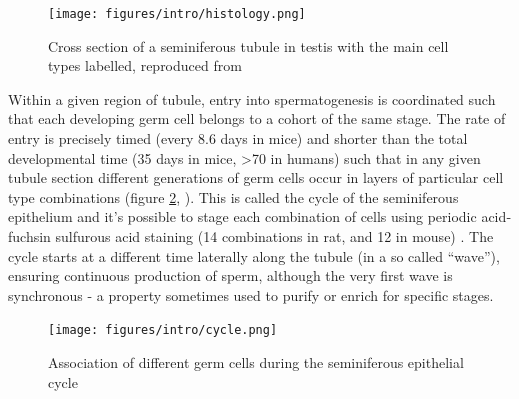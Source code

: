 \begin{figure}[H]
	\centering
	\texttt{[image: figures/intro/histology.png]}
	\caption[Testis Anatomy]{Cross section of a seminiferous tubule in testis with the main cell types labelled, reproduced from~\cite{Junqueira2005Basic}}
	\label{fig:histology}
\end{figure}

Within a given region of tubule, entry into spermatogenesis is coordinated such that each developing germ cell belongs to a cohort of the same stage. The rate of entry is precisely timed (every 8.6 days in mice) and shorter than the total developmental time (35 days in mice, >70 in humans) such that in any given tubule section different generations of germ cells occur in layers of particular cell type combinations (figure \ref{fig:cycle}, \cite{Oakberg1956Duration,Clermont1969Duration, Heller1969Human}). This is called the cycle of the seminiferous epithelium and it's possible to stage each combination of cells using periodic acid‐fuchsin sulfurous acid staining (14 combinations in rat, and 12 in mouse) \parencite{Leblond1952Spermiogenesis, Leblond1952Definition, Oakberg1956description}. The cycle starts at a different time laterally along the tubule (in a so called ``wave''), ensuring continuous production of sperm, although the very first wave is synchronous - a property sometimes used to purify or enrich for specific stages.

\begin{figure}[H]
	\centering
	\texttt{[image: figures/intro/cycle.png]}
	\caption[Seminiferous Cycle]{Association of different germ cells during the seminiferous epithelial cycle~\cite[Reproduced from ][]{Monesi1978Chapter}}
	\label{fig:cycle}
\end{figure}


